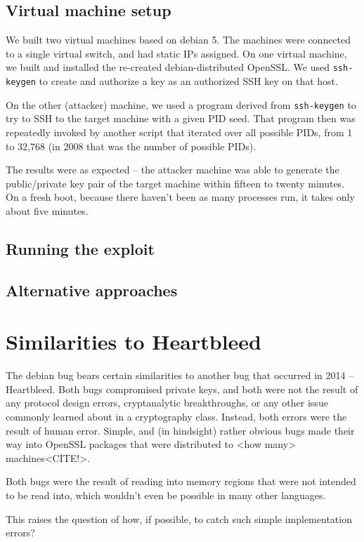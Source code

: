 \documentclass[conference]{IEEEtran}
\begin{document}
\subsection{Virtual machine setup}
We built two virtual machines based on debian 5. The machines were
connected to a single virtual switch, and had static IPs assigned. On
one virtual machine, we built and installed the re-created
debian-distributed OpenSSL. We used \verb|ssh-keygen| to create and
authorize a key as an authorized SSH key on that host.

On the other (attacker) machine, we used a program derived from
\verb|ssh-keygen| to try to SSH to the target machine with a given PID
seed. That program then was repeatedly invoked by another script that
iterated over all possible PIDs, from 1 to 32,768 (in 2008 that was
the number of possible PIDs).

The results were as expected -- the attacker machine was able to
generate the public/private key pair of the target machine within
fifteen to twenty minutes. On a fresh boot, because there haven't been
as many processes run, it takes only about five minutes.

\subsection{Running the exploit}

\subsection{Alternative approaches}

\section{Similarities to Heartbleed}
The debian bug bears certain similarities to another bug that occurred
in 2014 -- Heartbleed\cite{4}. Both bugs compromised private keys, and
both were not the result of any protocol design errors, cryptanalytic
breakthroughs, or any other issue commonly learned about in a
cryptography class. Instead, both errors were the result of human
error. Simple, and (in hindsight) rather obvious bugs made their way
into OpenSSL packages that were distributed to <how many>
machines<CITE!>.

Both bugs were the result of reading into memory regions that were not
intended to be read into, which wouldn't even be possible in many
other languages.

This raises the question of how, if possible, to catch such simple
implementation errors?
\end{document}
